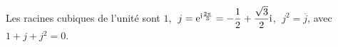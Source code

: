 \begin{exemple}
	Les racines cubiques de l'unité sont
	$1$, $\;j = \mathrm{e}^{\mathrm{i}\frac{2\pi}{3}} = -\dfrac{1}{2} + \dfrac{\sqrt3}{2}\mathrm{i}$,
	$\;j^2 = \overline{j}$, avec $1 + j + j^2 = 0$.
\end{exemple}


%
%
%
%
%
%
%
